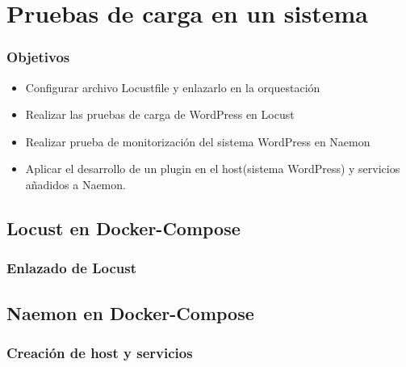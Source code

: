 \documentclass{beamer}
\theoremstyle{plain}
\theoremstyle{definition}
\theoremstyle{plain}
\theoremstyle{definition}
\theoremstyle{remark}
\theoremstyle{definition}
\begin{document}
\section{Pruebas de carga en un sistema} %
\begin{frame}
	
	\frametitle{Objetivos}
	\begin{itemize}
		
		\item Configurar archivo Locustfile y enlazarlo en la orquestación
		\item Realizar las pruebas de carga de WordPress en Locust
		\item Realizar prueba de monitorización del sistema WordPress en Naemon
		\item Aplicar el desarrollo de un plugin en el host(sistema WordPress) y servicios añadidos a Naemon.		
	\end{itemize}
	
\end{frame}

\subsection{Locust en Docker-Compose}
\begin{frame}
	\frametitle{Enlazado de Locust}
	
\end{frame}
\begin{frame}
	\frametitle{Resultados
	\end{frame}
\subsection{Naemon en Docker-Compose}
\begin{frame}
	\frametitle{Creación de host y servicios}
	
\end{frame}
\begin{frame}
	\frametitle{Resultados
	\end{frame}
\end{document}
